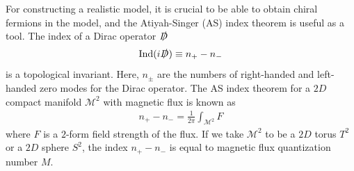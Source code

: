 \documentclass[11pt]{article}
\begin{document}
For constructing a realistic model, it is crucial to be able to obtain chiral fermions in the model, and the Atiyah-Singer (AS) index theorem \cite{Atiyah:1963zz} is useful as a tool.
The index of a Dirac operator $\slashed{D}$
\begin{align}
    {\rm{Ind}}(i\slashed{D})\equiv n_{+}-n_{-}
    \label{index1}
\end{align}
is a topological invariant. Here, $n_{\pm}$ are the numbers of right-handed and left-handed zero modes for the Dirac operator. 
The AS index theorem for a $2D$ compact manifold ${\mathcal{M}}^2$ with magnetic flux is known as \cite{Witten:1984dg,Green:1987mn}
\begin{align}
     n_{+}-n_{-}=\frac{1}{2\pi}\int_{{\mathcal{M}}^2} F
     \label{index2}
\end{align}
where $F$ is a $2$-form field strength of the flux. If we take ${\mathcal{M}}^2$ to be a $2D$ torus $T^2$ or a $2D$ sphere $S^2$, the index $n_{+}-n_{-}$ is equal to magnetic flux quantization number $M$. 
\end{document}
